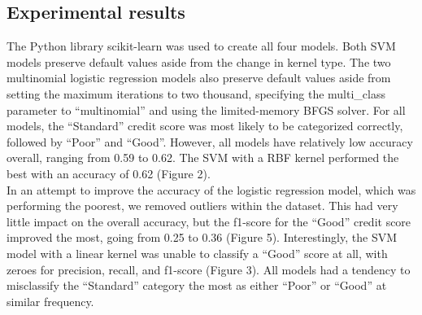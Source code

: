 \documentclass[11pt]{article}
\begin{document}
\begin{multicols}{2}
\section*{Experimental results}
The Python library scikit-learn was used to create all four models. Both SVM models preserve default values aside from the change
in kernel type. The two multinomial logistic regression models also preserve default values aside from setting the maximum iterations
to two thousand, specifying the multi\_class parameter to ``multinomial'' and using the limited-memory BFGS solver.
For all models, the ``Standard'' credit score was most likely to be categorized correctly, followed by ``Poor'' and ``Good''. 
However, all models have relatively low accuracy overall, ranging from 0.59 to 0.62. The SVM with a RBF kernel performed the best with an
accuracy of 0.62 (Figure 2). \\
In an attempt to improve the accuracy of the logistic regression model, which was performing the poorest, we removed outliers within the dataset.
This had very little impact on the overall accuracy, but the f1-score for the ``Good'' credit score improved the most, going from 0.25 to 0.36 (Figure 5).
Interestingly, the SVM model with a linear kernel was unable to classify a ``Good'' score at all, with zeroes for precision, 
recall, and f1-score (Figure 3). All models had a tendency to misclassify the ``Standard'' category the most as either ``Poor'' or 
``Good'' at similar frequency. 
\end{multicols}
\end{document}
